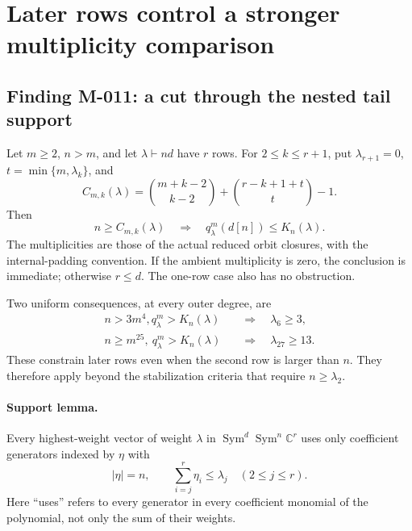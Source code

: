 \section{Later rows control a stronger multiplicity comparison}

\subsection*{Finding M-011: a cut through the nested tail support}
Let \(m\geq2\), \(n>m\), and let \(\lambda\vdash nd\)
have \(r\) rows. For \(2\leq k\leq r+1\), put
\(\lambda_{r+1}=0\), \(t=\min\{m,\lambda_k\}\), and
\[
 C_{m,k}(\lambda)=
 \binom{m+k-2}{k-2}
 +\binom{r-k+1+t}{t}-1.
\]
Then
\begin{equation}\label{eq:M011}
 n\geq C_{m,k}(\lambda)
 \quad\Longrightarrow\quad
                  q^m_\lambda(d[n])\leq K_n(\lambda).
\end{equation}
The multiplicities are those of the actual reduced orbit
closures, with the internal-padding convention. If the ambient
multiplicity is zero, the conclusion is immediate; otherwise
\(r\leq d\). The one-row case also has no obstruction.

Two uniform consequences, at every outer degree, are
\begin{align}
 n>3m^4, q^m_\lambda>K_n(\lambda)
       &\quad\Longrightarrow\quad \lambda_6\geq3,
                                                    \label{eq:M011IP}\\
 n\geq m^{25},\ q^m_\lambda>K_n(\lambda)
       &\quad\Longrightarrow\quad \lambda_{27}\geq13.
                                                    \label{eq:M011BIP}
\end{align}
These constrain later rows even when the second row is larger
than \(n\). They therefore apply beyond the stabilization
criteria that require \(n\geq\lambda_2\).

\paragraph{Support lemma.}
Every highest-weight vector of weight \(\lambda\) in
\(\operatorname{Sym}^d\operatorname{Sym}^n\mathbb C^r\)
uses only coefficient generators indexed by \(\eta\) with
\[
        |\eta|=n,\qquad
        \sum_{i=j}^r\eta_i\leq\lambda_j
                       \quad(2\leq j\leq r).          \tag{M-011.1}
\]
Here ``uses'' refers to every generator in every coefficient
monomial of the polynomial, not only the sum of their weights.

